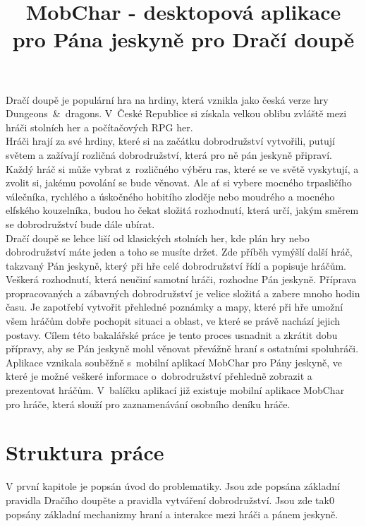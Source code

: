 \documentclass[thesis=B,czech]{resources/FITthesis}[2012/06/26]
\title{	MobChar - desktopová aplikace pro Pána jeskyně pro Dračí doupě}
\begin{document}

\begin{introduction}
Dračí doupě je populární hra na hrdiny, která vznikla jako česká verze hry Dungeons~\&~dragons. V~České Republice si získala velkou oblibu zvláště mezi hráči stolních her a počítačových RPG her.\\

Hráči hrají za své hrdiny, které si na začátku dobrodružství vytvořili, putují světem a zažívají rozličná dobrodružství, která pro ně pán jeskyně připraví. Každý hráč si může vybrat z~rozličného výběru ras, které se ve světě vyskytují, a zvolit si, jakému povolání se bude věnovat. Ale ať si vybere mocného trpasličího válečníka, rychlého a úskočného hobitího zloděje nebo moudrého a mocného elfského kouzelníka, budou ho čekat složitá rozhodnutí, která určí, jakým směrem se dobrodružství bude dále ubírat. \\

Dračí doupě se lehce liší od klasických stolních her, kde plán hry nebo dobrodružství máte jeden a toho se musíte držet. Zde příběh vymýšlí další hráč, takzvaný Pán jeskyně, který při hře celé dobrodružství řídí a popisuje hráčům. Veškerá rozhodnutí, která neučiní samotní hráči, rozhodne Pán jeskyně. Příprava propracovaných a zábavných dobrodružství je velice složitá a zabere mnoho hodin času. Je zapotřebí vytvořit přehledné poznámky a mapy, které při hře umožní všem hráčům dobře pochopit situaci a oblast, ve které se právě nachází jejich postavy. Cílem této bakalářské práce je tento proces usnadnit a zkrátit dobu přípravy, aby se Pán jeskyně mohl věnovat převážně hraní s ostatními spoluhráči. \\

Aplikace vznikala souběžně s~mobilní aplikací MobChar pro Pány jeskyně\cite{Shanel_2017}, ve které je možné veškeré 	informace o~dobrodružství přehledně zobrazit a prezentovat hráčům. V~balíčku aplikací již existuje mobilní aplikace MobChar pro hráče, která slouží pro zaznamenávání osobního deníku hráče\cite{Weberova_2017}. \\


\section*{Struktura práce}
V první kapitole je popsán úvod do problematiky. Jsou zde popsána základní pravidla Dračího doupěte a pravidla vytváření dobrodružství. Jsou zde tak0 popsány základní mechanizmy hraní a interakce mezi hráči a pánem jeskyně.


\end{introduction}
\end{document}

